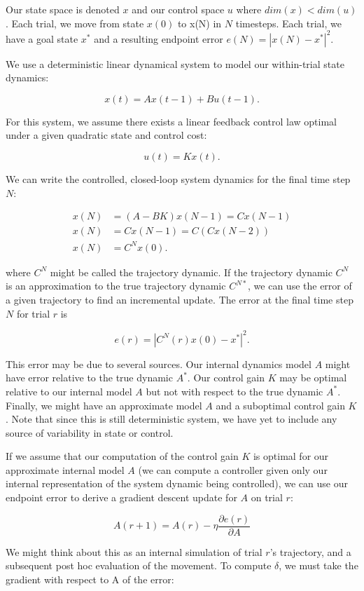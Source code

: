 \documentclass[
  a4paper,
]{article}
\begin{document}
Our state space is denoted \(x\) and our control space \(u\) where
\(dim(x) < dim(u)\). Each trial, we move from state \(x(0)\) to x(N) in
\(N\) timesteps. Each trial, we have a goal state \(x^*\) and a
resulting endpoint error \(e(N) = |x(N) - x^*|^2\).

We use a deterministic linear dynamical system to model our within-trial
state dynamics:

\[
x(t) = Ax(t-1) + Bu(t-1).
\]

For this system, we assume there exists a linear feedback control law
optimal under a given quadratic state and control cost:

\[
u(t) = Kx(t).
\]

We can write the controlled, closed-loop system dynamics for the final
time step \(N\):

\[
\begin{aligned} 
x(N) &= (A - BK)x(N-1) = Cx(N-1) \\
x(N) &= Cx(N-1) = C(Cx(N-2)) \\
x(N) &= C^Nx(0).
\end{aligned} 
\]

where \(C^N\) might be called the trajectory dynamic. If the trajectory
dynamic \(C^N\) is an approximation to the true trajectory dynamic
\(C^{N*}\), we can use the error of a given trajectory to find an
incremental update. The error at the final time step \(N\) for trial
\(r\) is

\[
e(r) = |C^N(r)x(0) - x^*|^2.
\]

This error may be due to several sources. Our internal dynamics model
\(A\) might have error relative to the true dynamic \(A^*\). Our control
gain \(K\) may be optimal relative to our internal model \(A\) but not
with respect to the true dynamic \(A^*\). Finally, we might have an
approximate model \(A\) and a suboptimal control gain \(K\). Note that
since this is still deterministic system, we have yet to include any
source of variability in state or control.

If we assume that our computation of the control gain \(K\) is optimal
for our approximate internal model \(A\) (we can compute a controller
given only our internal representation of the system dynamic being
controlled), we can use our endpoint error to derive a gradient descent
update for \(A\) on trial \(r\):

\[
A(r+1) = A(r) - \eta\frac{\partial{e(r)}}{\partial{A}}
\]

We might think about this as an internal simulation of trial \(r\)'s
trajectory, and a subsequent post hoc evaluation of the movement. To
compute \(\delta\), we must take the gradient with respect to A of the
error:
\end{document}
